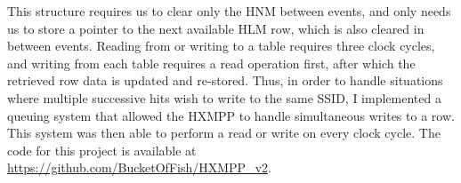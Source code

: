 This structure requires us to clear only the HNM between events, and only needs us to store a pointer to the next available HLM row, which is also cleared in between events. Reading from or writing to a table requires three clock cycles, and writing from each table requires a read operation first, after which the retrieved row data is updated and re-stored. Thus, in order to handle situations where multiple successive hits wish to write to the same SSID, I implemented a queuing system that allowed the HXMPP to handle simultaneous writes to a row. This system was then able to perform a read or write on every clock cycle. The code for this project is available at \url{https://github.com/BucketOfFish/HXMPP_v2}.